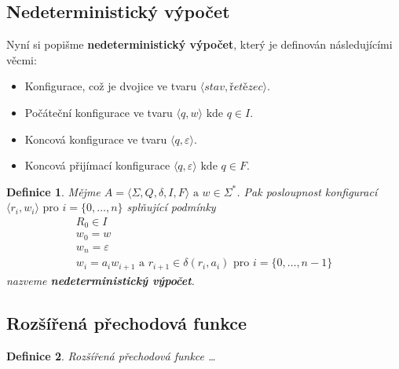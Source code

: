 \documentclass[10pt, a4paper, titlepage]{article}
\theoremstyle{note}
\newtheorem{definice}{\textbf{Definice}}
\begin{document}
\subsection{Nedeterministický výpočet}
Nyní si popišme \textbf{nedeterministický výpočet}, který je definován následujícími věcmi:
\begin{itemize}
\item
Konfigurace, což je dvojice ve tvaru $ \langle \textit{stav}, \textit{řetězec} \rangle $.
\item
Počáteční konfigurace ve tvaru $ \langle q, w \rangle \text{ kde } q \in I$.
\item
Koncová konfigurace ve tvaru $ \langle q, \varepsilon \rangle $.
\item
Koncová přijímací konfigurace $ \langle q, \varepsilon \rangle \text{ kde } q \in F$.
\end{itemize}

\begin{definice}
Mějme $ A = \langle \Sigma, Q, \delta, I, F \rangle  \text{ a } w \in \Sigma^{*}$. Pak posloupnost konfigurací $ \langle r_{i}, w_{i} \rangle \text{ pro } i = \lbrace 0, \ldots, n \rbrace $ splňující podmínky
\begin{gather}
R_{0} \in I \\
w_{0} = w \\
w_{n} = \varepsilon \\
w_{i} = a_{i}w_{i+1} \text{ a } r_{i+1} \in \delta (r_{i}, a_{i}) \text{ pro } i = \lbrace 0, \ldots,  n-1 \rbrace
\end{gather}
nazveme \textbf{nedeterministický výpočet}.
\end{definice}

\subsection{Rozšířená přechodová funkce}
\begin{definice}
Rozšířená přechodová funkce \ldots
\end{definice}

\renewcommand{\indexcolumns}{3}
\printindex
\end{document}
